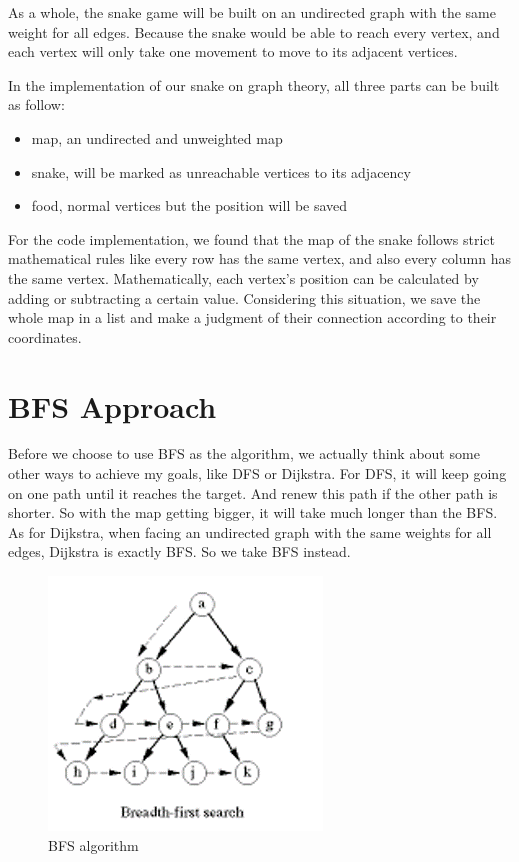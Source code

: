 \documentclass[12pt]{article}
\begin{document}
As a whole, the snake game will be built on an undirected graph with the same weight for all edges. Because the snake would be able to reach every vertex, and each vertex will only take one movement to move to its adjacent vertices.

In the implementation of our snake on graph theory, all three parts can be built as follow:
\begin{itemize}
    \item map, an undirected and unweighted map
    \item snake, will be marked as unreachable vertices to its adjacency
    \item food, normal vertices but the position will be saved
\end{itemize}

For the code implementation, we found that the map of the snake follows strict mathematical rules like every row has the same vertex, and also every column has the same vertex. Mathematically, each vertex's position can be calculated by adding or subtracting a certain value. Considering this situation, we save the whole map in a list and make a judgment of their connection according to their coordinates.

\section{BFS Approach}
Before we choose to use BFS as the algorithm, we actually think about some other ways to achieve my goals, like DFS or Dijkstra. For DFS, it will keep going on one path until it reaches the target. And renew this path if the other path is shorter. So with the map getting bigger, it will take much longer than the BFS. As for Dijkstra, when facing an undirected graph with the same weights for all edges, Dijkstra is exactly BFS. So we take BFS instead.

\begin{figure}[H]
    \centering 
    \includegraphics[scale = 0.8]{1.png}
    \caption{BFS algorithm}
    \label{fig:figure1}
\end{figure}
\end{document}
